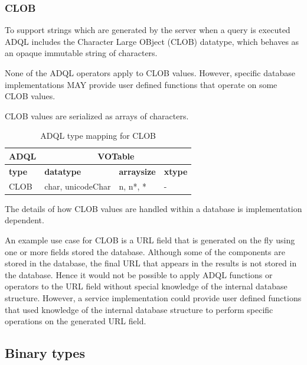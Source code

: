 \documentclass[11pt,a4paper]{ivoa}
\begin{document}
\subsubsection{CLOB}
\label{sec:types.character.clob}

To support strings which are generated by the server when a query is executed
ADQL includes the Character Large OBject (CLOB) datatype,
which behaves as an opaque immutable string of characters.

None of the ADQL operators apply to CLOB values.
However, specific database implementations MAY provide user
defined functions that operate on some CLOB values.

CLOB values are serialized as arrays of characters.

\begin{table}[thm]\footnotesize
    \begin{tabular}
        {|p{}|p{}|p{}|p{}|}
        \hline

        \hline
        \multicolumn{1}{|c|}{\textbf{ADQL}} &
        \multicolumn{3}{|c|}{\textbf{VOTable}}
        \tabularnewline
        
        \hline
        \textbf{type} &
        \textbf{datatype} &
        \textbf{arraysize} &
        \textbf{xtype}
        \tabularnewline

        \hline
        CLOB &
        char, unicodeChar &
        n, n*, * &
        -
        \tabularnewline

        \hline
    \end{tabular}
    \caption{ADQL type mapping for CLOB}
    \label{table:types.character.clob}
\end{table}

The details of how CLOB values are handled within a
database is implementation dependent.

An example use case for CLOB is a URL field that is generated on the fly
using one or more fields stored the database.
Although some of the components are stored in the database, the final URL
that appears in the results is not stored in the database.
Hence it would not be possible to apply ADQL functions or operators to the
URL field without special knowledge of the internal database structure.
However, a service implementation could provide user defined functions
that used knowledge of the internal database structure to perform
specific operations on the generated URL field.

\subsection{Binary types}
\label{sec:types.binary}
\end{document}
